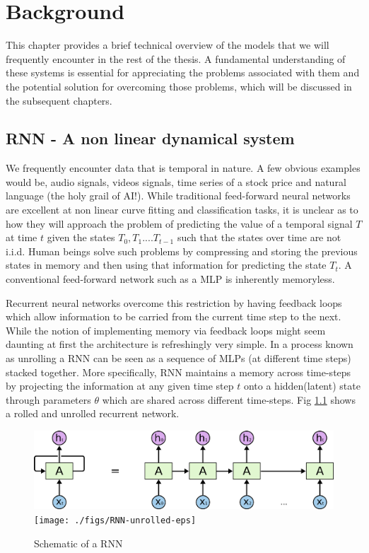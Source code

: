 \chapter{Background}
This chapter provides a brief technical overview of the models that we will frequently encounter in the rest of the thesis. A fundamental understanding of these systems is essential for appreciating the problems associated with them and the potential solution for overcoming those problems, which will be discussed in the subsequent chapters.

\section{RNN - A non linear dynamical system} \label{RNN}
We frequently encounter data that is temporal in nature. A few obvious examples would  be, audio signals, videos signals, time series of a stock price and natural language (the holy grail of AI!). While traditional feed-forward neural networks are excellent at non linear curve fitting and classification tasks, it is unclear as to how they will approach the problem of predicting the value of a temporal signal $T$ at time $t$ given the states $T_{0}, T_{1}....T_{t-1}$ such that the states over time are not i.i.d. Human beings solve such problems by compressing and storing the previous states in memory and then using that information for predicting the state $T_t$. A conventional feed-forward network such as a MLP is inherently memoryless.

Recurrent neural networks overcome this restriction by having feedback loops which allow information to be carried from the current time step to the next. While the notion of implementing memory via feedback loops might seem daunting at first the architecture is refreshingly very simple. In a process known as unrolling a RNN can be seen as a sequence of MLPs (at different time steps) stacked together. More specifically, RNN maintains a memory across time-steps by projecting the information at any given time step $t$ onto a hidden(latent) state through parameters $\theta$ which are shared across different time-steps. Fig \ref{bck:rnn} shows a rolled and unrolled recurrent network.

\begin{figure}
	\begin{minipage}[t]{\textwidth}
		\ifpdf
		\includegraphics[width=\linewidth,keepaspectratio=true]{./figs/RNN-unrolled-pdf}
		\else
		\texttt{[image: ./figs/RNN-unrolled-eps]}
		\fi
		\caption{\small Schematic of a RNN \cite{olah}}
		\label{bck:rnn}
	\end{minipage}
\end{figure}

